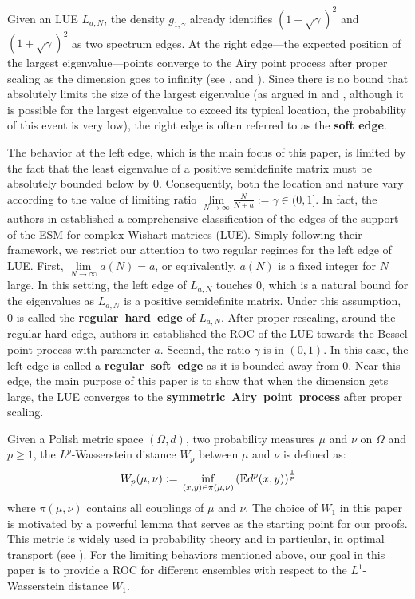 \documentclass[11pt]{article}
\numberwithin{equation}{section}%
\numberwithin{theorem}{section}
\begin{document}
Given an LUE $L_{a,N}$, the density $g_{1,\gamma}$ already identifies $(1-\sqrt\gamma)^2$ and $(1+\sqrt\gamma)^2$ as two spectrum edges. At the right edge---the expected position of the largest eigenvalue---points converge to the Airy point process after proper scaling as the dimension goes to infinity (see \cite{cai2025mesoscopicratesconvergencehermitian}, \cite{el2006rate} and \cite{johnstone2001distribution}). Since there is no bound that absolutely limits the size of the largest eigenvalue (as argued in \cite{bai1993convergence} and \cite{geman_limit_1980}, although it is possible for the largest eigenvalue to exceed its typical location, the probability of this event is very low), the right edge is often referred to as the \textbf{soft edge}.

The behavior at the left edge, which is the main focus of this paper, is limited by the fact that the least eigenvalue of a positive semidefinite matrix must be absolutely bounded below by $0$. Consequently, both the location and nature vary according to the value of limiting ratio $\lim\limits_{N\rightarrow\infty}\frac{N}{N+a}:=\gamma\in(0,1]$. In fact, the authors in \cite{hachem_large_2016} established a comprehensive classification of the edges of the support of the ESM for complex Wishart matrices (LUE). Simply following their framework, we restrict our attention to two regular regimes for the left edge of LUE. First, $\lim\limits_{N\rightarrow\infty }a(N)=a$, or equivalently, $a(N)$ is a fixed integer for $N$ large. In this setting, the left edge of $L_{a,N}$ touches $0$, which is a natural bound for the eigenvalues as $L_{a,N}$ is a positive semidefinite matrix. Under this assumption, $0$ is called the \textbf{regular~hard~edge} of $L_{a,N}$. After proper rescaling, around the regular hard edge, authors in \cite{cai2025mesoscopicratesconvergencehermitian} established the ROC of the LUE towards the Bessel point process with parameter $a$. Second, the ratio $\gamma$ is in $(0,1)$. In this case, the left edge is called a \textbf{regular~soft~edge} as it is bounded away from $0$. Near this edge, the main purpose of this paper is to show that when the dimension gets large, the LUE converges to the \textbf{symmetric~Airy~point~process} after proper scaling.

Given a Polish metric space $(\Omega,d)$, two probability measures $\mu$ and $\nu$ on $\Omega$ and $p\ge1$, the $L^p$-Wasserstein distance $W_p$ between $\mu$ and $\nu$ is defined as:
\begin{equation*}
W_p(\mu,\nu):=\\\inf_{(x,y)\in\pi(\mu,\nu)}\left(\mathbb{E}d^p(x,y)\right)^{\frac{1}{p}}
\end{equation*}
where $\pi(\mu,\nu)$ contains all couplings of $\mu$ and $\nu$. The choice of $W_1$ in this paper is motivated by a powerful lemma that serves as the starting point for our proofs. This metric is widely used in probability theory and in particular, in optimal transport (see \cite[Chapter $6$]{villani2009optimal}). For the limiting behaviors mentioned above, our goal in this paper is to provide a ROC for different ensembles with respect to the $L^1$-Wasserstein distance $W_1$.
\end{document}
